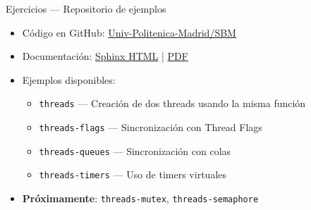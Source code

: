 \begin{frame}{Ejercicios — Repositorio de ejemplos}
    \begin{itemize}
        \item Código en GitHub:
              \href{https://github.com/Univ-Politecnica-Madrid/SBM}{Univ-Politenica-Madrid/SBM}
        \item Documentación:
              \href{ https://univ-politecnica-madrid.github.io/SBM/}{Sphinx HTML} |
              \href{ https://univ-politecnica-madrid.github.io/SBM/simplepdf/SBM-CMSIS-RTOS-V2.pdf}{PDF}
        \item Ejemplos disponibles:
            \begin{itemize}
                \item \texttt{threads} — Creación de dos threads usando la
                      misma función
                \item \texttt{threads-flags} — Sincronización con Thread Flags
                \item \texttt{threads-queues} — Sincronización con colas
                \item \texttt{threads-timers} — Uso de timers virtuales
            \end{itemize}
        \item \textbf{Próximamente}: \texttt{threads-mutex},
              \texttt{threads-semaphore}
    \end{itemize}
\end{frame}

